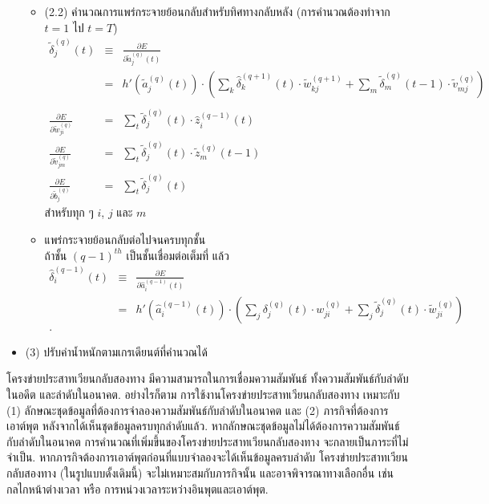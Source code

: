 \begin{itemize}
\begin{itemize}
	\item (2.2) คำนวณการแพร่กระจายย้อนกลับสำหรับทิศทางกลับหลัง
	(การคำนวณต้องทำจาก $t=1$ ไป $t=T$)\\
	\begin{eqnarray}
	\tilde{\delta}_j^{(q)}(t) 
	&\equiv& \frac{\partial E}{\partial \tilde{a}_j^{(q)}(t)}
	\nonumber \\
	&=& h'(\tilde{a}_j^{(q)}(t))
	\cdot \left(\sum_k \hat{\delta}_k^{(q+1)}(t) \cdot \tilde{w}_{kj}^{(q+1)} 
	+ \sum_m  \tilde{\delta}_m^{(q)}(t-1) \cdot \tilde{v}_{mj}^{(q)}\right)
	\nonumber \\
	\label{eq: BRNN backprop delta} \\
	\frac{\partial E}{\partial \tilde{w}_{ji}^{(q)}}
	&=& \sum_t \tilde{\delta}_j^{(q)}(t) \cdot \hat{z}_i^{(q-1)}(t)
	\label{eq: BRNN backprop dEw} \\
	\frac{\partial E}{\partial \tilde{v}_{jm}^{(q)}}
	&=& \sum_t \tilde{\delta}_j^{(q)}(t) \cdot \tilde{z}_m^{(q)}(t-1)
	\label{eq: BRNN backprop dEv} \\
	\frac{\partial E}{\partial \tilde{b}_j^{(q)}}
	&=&
	\sum_t \tilde{\delta}_j^{(q)}(t) 
	\label{eq: BRNN backprop dEb}
	\end{eqnarray}
	สำหรับทุก ๆ $i$, $j$ และ $m$
	
	\item แพร่กระจายย้อนกลับต่อไปจนครบทุกชั้น\\
	ถ้าชั้น $(q-1)^{th}$ เป็นชั้นเชื่อมต่อเต็มที่
	แล้ว
	\begin{eqnarray}
	\hat{\delta}_i^{(q-1)}(t) 
	&\equiv& \frac{\partial E}{\partial \hat{a}_i^{(q-1)}(t)}
	\nonumber \\
	&=& h'(\hat{a}_i^{(q-1)}(t))
	\cdot \left(\sum_j \delta_j^{(q)}(t) \cdot w_{ji}^{(q)}
	+ \sum_j \tilde{\delta}_j^{(q)}(t) \cdot \tilde{w}_{ji}^{(q)} 
	\right)
	\nonumber \\
	\label{eq: BRNN backprop previous delta}.
	\end{eqnarray}	
	\end{itemize}

\item (3) ปรับค่าน้ำหนักตามเกรเดียนต์ที่คำนวณได้
\end{itemize}

โครงข่ายประสาทเวียนกลับสองทาง
มีความสามารถในการเชื่อมความสัมพันธ์ ทั้งความสัมพันธ์กับลำดับในอดีต และลำดับในอนาคต.
อย่างไรก็ตาม
การใช้งานโครงข่ายประสาทเวียนกลับสองทาง
เหมาะกับ
(1) ลักษณะชุดข้อมูลที่ต้องการจำลองความสัมพันธ์กับลำดับในอนาคต
และ
(2) ภารกิจที่ต้องการเอาต์พุต หลังจากได้เห็นชุดข้อมูลครบทุกลำดับแล้ว.
หากลักษณะชุดข้อมูลไม่ได้ต้องการความสัมพันธ์กับลำดับในอนาคต
การคำนวณที่เพิ่มขึ้นของโครงข่ายประสาทเวียนกลับสองทาง
จะกลายเป็นภาระที่ไม่จำเป็น.
%
หากภารกิจต้องการเอาต์พุตก่อนที่แบบจำลองจะได้เห็นข้อมูลครบลำดับ
โครงข่ายประสาทเวียนกลับสองทาง (ในรูปแบบดั้งเดิมนี้)
จะไม่เหมาะสมกับภารกิจนั้น
และอาจพิจารณาทางเลือกอื่น เช่น กลไกหน้าต่างเวลา หรือ การหน่วงเวลาระหว่างอินพุตและเอาต์พุต.

